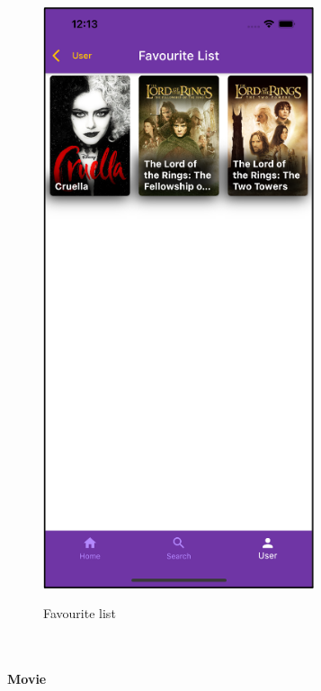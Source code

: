 \documentclass[12pt, a4paper]{article}
\numberwithin{figure}{section}
\begin{document}
\begin{center}
\begin{minipage}[t]{0.31\textwidth}
\begin{figure}[H]
			\centering
			\includegraphics[width=0.71\textwidth]{images/final/favourite.png}\\
			\caption{Favourite list}
		\end{figure}
	\end{minipage}
\end{center}

\mbox{}\\

\paragraph{Movie}
\end{document}
